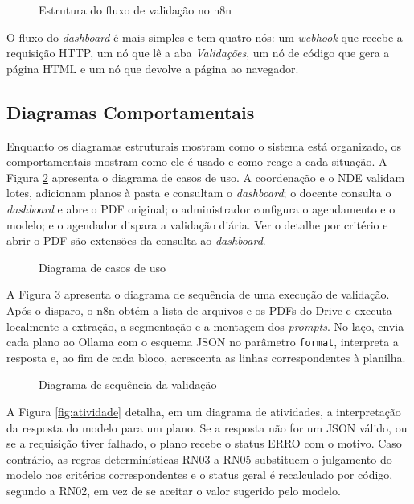 \begin{figure}[htbp]
\centering
\caption{Estrutura do fluxo de validação no n8n}
\label{fig:pipeline}
\resizebox{\textwidth}{!}{}
\end{figure}

O fluxo do \textit{dashboard} é mais simples e tem quatro nós: um \textit{webhook} que recebe a requisição HTTP, um nó que lê a aba \textit{Validações}, um nó de código que gera a página HTML e um nó que devolve a página ao navegador.

\subsection{Diagramas Comportamentais}

Enquanto os diagramas estruturais mostram como o sistema está organizado, os comportamentais mostram como ele é usado e como reage a cada situação. A Figura \ref{fig:casos} apresenta o diagrama de casos de uso. A coordenação e o NDE validam lotes, adicionam planos à pasta e consultam o \textit{dashboard}; o docente consulta o \textit{dashboard} e abre o PDF original; o administrador configura o agendamento e o modelo; e o agendador dispara a validação diária. Ver o detalhe por critério e abrir o PDF são extensões da consulta ao \textit{dashboard}.

\begin{figure}[htbp]
\centering
\caption{Diagrama de casos de uso}
\label{fig:casos}
\resizebox{0.95\textwidth}{!}{}
\end{figure}

A Figura \ref{fig:sequencia} apresenta o diagrama de sequência de uma execução de validação. Após o disparo, o n8n obtém a lista de arquivos e os PDFs do Drive e executa localmente a extração, a segmentação e a montagem dos \textit{prompts}. No laço, envia cada plano ao Ollama com o esquema JSON no parâmetro \texttt{format}, interpreta a resposta e, ao fim de cada bloco, acrescenta as linhas correspondentes à planilha.

\begin{figure}[htbp]
\centering
\caption{Diagrama de sequência da validação}
\label{fig:sequencia}
\resizebox{\textwidth}{!}{}
\end{figure}

A Figura \ref{fig:atividade} detalha, em um diagrama de atividades, a interpretação da resposta do modelo para um plano. Se a resposta não for um JSON válido, ou se a requisição tiver falhado, o plano recebe o status ERRO com o motivo. Caso contrário, as regras determinísticas RN03 a RN05 substituem o julgamento do modelo nos critérios correspondentes e o status geral é recalculado por código, segundo a RN02, em vez de se aceitar o valor sugerido pelo modelo.

